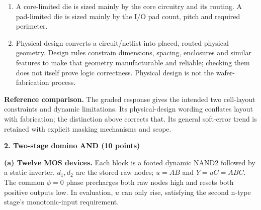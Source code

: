 \documentclass[10pt]{article}
\newcommand{\qheading}[1]{\par\medskip\textbf{#1}\par}
\begin{document}
\begin{enumerate}[label=(\alph*),leftmargin=7mm]
\item A core-limited die is sized mainly by the core circuitry and its routing. A pad-limited die is sized mainly by the I/O pad count, pitch and required perimeter.
\item Physical design converts a circuit/netlist into placed, routed physical geometry. Design rules constrain dimensions, spacing, enclosures and similar features to make that geometry manufacturable and reliable; checking them does not itself prove logic correctness. Physical design is not the wafer-fabrication process.
\end{enumerate}
\textbf{Reference comparison.} The graded response gives the intended two cell-layout constraints and dynamic limitations. Its physical-design wording conflates layout with fabrication; the distinction above corrects that. Its general soft-error trend is retained with explicit masking mechanisms and scope.
\newpage
\qheading{2. Two-stage domino AND (10 points)}
\textbf{(a) Twelve MOS devices.} Each block is a footed dynamic NAND2 followed by a static inverter. $d_1,d_2$ are the stored raw nodes; $u=AB$ and $Y=uC=ABC$. The common $\phi=0$ phase precharges both raw nodes high and resets both positive outputs low. In evaluation, $u$ can only rise, satisfying the second n-type stage's monotonic-input requirement.
\end{document}
